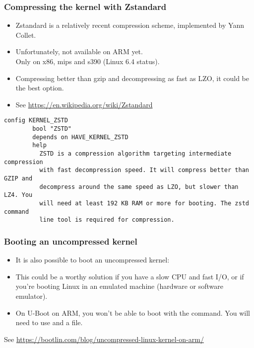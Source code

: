 \begin{frame}[fragile]
\frametitle{Compressing the kernel with Zstandard}
\begin{itemize}
  \item Zstandard is a relatively recent compression scheme, implemented
        by Yann Collet.
  \item Unfortunately, not available on ARM yet.\\
        Only on x86, mips and s390 (Linux 6.4 status).
  \item Compressing better than gzip and decompressing as fast as LZO,
        it could be the best option.
  \item See \url{https://en.wikipedia.org/wiki/Zstandard}
\end{itemize}
\begin{block}{}
\small
\begin{verbatim}
config KERNEL_ZSTD
        bool "ZSTD"
        depends on HAVE_KERNEL_ZSTD
        help
          ZSTD is a compression algorithm targeting intermediate compression
          with fast decompression speed. It will compress better than GZIP and
          decompress around the same speed as LZO, but slower than LZ4. You
          will need at least 192 KB RAM or more for booting. The zstd command
          line tool is required for compression.
\end{verbatim}
\end{block}
\end{frame}

\begin{frame}
\frametitle{Booting an uncompressed kernel}
\begin{itemize}
    \item It is also possible to boot an uncompressed kernel:\\
    \item This could be a worthy solution if you have a slow CPU
          and fast I/O, or if you're booting Linux in an emulated
          machine (hardware or software emulator).
    \item On U-Boot on ARM, you won't be able to boot with the
           command. You will need to use 
          and a  file.
\end{itemize}
See \url{https://bootlin.com/blog/uncompressed-linux-kernel-on-arm/}
\end{frame}

